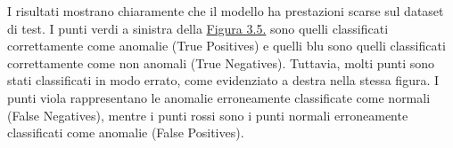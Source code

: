         I risultati mostrano chiaramente che il modello ha prestazioni scarse sul dataset di test. 
        I punti verdi a sinistra della \hyperref[fig:ocsvm-sol]{Figura 3.5.} sono quelli classificati correttamente 
        come anomalie (True Positives) e quelli blu sono quelli classificati correttamente come non anomali (True Negatives). 
        Tuttavia, molti punti sono stati classificati in modo errato, come evidenziato a destra nella stessa figura. 
        I punti viola rappresentano le anomalie erroneamente classificate come normali (False Negatives), 
        mentre i punti rossi sono i punti normali erroneamente classificati come anomalie (False Positives).  
        
